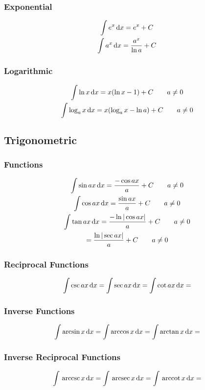 \documentclass[12pt]{article}
\begin{document}
			\subsubsection{Exponential}
				\begin{gather}
					\int e^x\,\text{d} x = e^x + C \\
					\int a^x\,\text{d} x = \frac{a^x}{\ln a} + C
				\end{gather}
			\subsubsection{Logarithmic}
				\begin{gather}
					\int \ln x\,\text{d} x = x(\ln x - 1) + C
					\qquad a \neq 0 \\
					\int \log_ax\,\text{d} x = x(\log_ax - \ln a) +
					C \qquad a \neq 0
				\end{gather}
		\subsection{Trigonometric}
			\subsubsection{Functions}
				\begin{gather}
					\int \sin ax\,\text{d} x = \frac{-\cos ax}{a} +
					C \qquad a \neq 0 \\
					\int \cos ax\,\text{d} x = \frac{\sin ax}{a} +
					C \qquad a \neq 0 \\
					\int \tan ax\,\text{d} x = \frac{-\ln |\cos
					ax|}{a} + C \qquad a \neq 0 \\
					= \frac{\ln |\sec ax|}{a} + C \qquad a
					\neq 0
				\end{gather}
			\subsubsection{Reciprocal Functions}
				\begin{gather}
					\int \csc ax\,\text{d} x =
					\int \sec ax\,\text{d} x =
					\int \cot ax\,\text{d} x =
				\end{gather}
			\subsubsection{Inverse Functions}
				\begin{gather}
					\int \arcsin x\,\text{d} x =
					\int \arccos x\,\text{d} x =
					\int \arctan x\,\text{d} x =
				\end{gather}
			\subsubsection{Inverse Reciprocal Functions}
				\begin{gather}
					\int \,\text{arccsc}\, x\,\text{d} x =
					\int \,\text{arcsec}\, x\,\text{d} x =
					\int \,\text{arccot}\, x\,\text{d} x =
				\end{gather}
\end{document}
